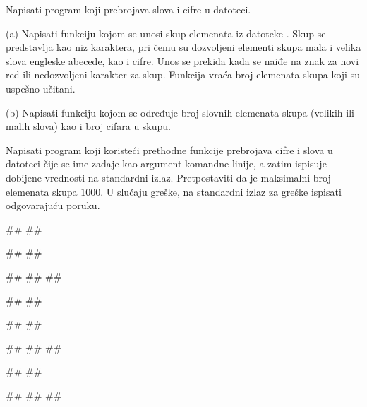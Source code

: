 \begin{Exercise}[label=p3_x4]         
Napisati program koji prebrojava slova i cifre u datoteci.
\begin{description}
\item{(a)} Napisati funkciju 
  kojom se unosi skup elemenata iz datoteke . Skup se predstavlja kao
  niz karaktera, pri čemu su dozvoljeni elementi skupa mala i
  velika slova engleske abecede, kao i cifre.  Unos se prekida kada se naiđe
  na znak za novi red ili nedozvoljeni karakter za skup.
  Funkcija vraća broj elemenata skupa koji su uspešno učitani.
\item{(b)} Napisati funkciju
   kojom se
  određuje broj slovnih elemenata skupa (velikih ili malih slova)
  kao i broj cifara u skupu.
\end{description}
Napisati program koji koristeći prethodne funkcije prebrojava cifre i slova u datoteci 
čije se ime zadaje kao argument komandne linije, a zatim ispisuje dobijene vrednosti na standardni izlaz.
Pretpostaviti da je maksimalni broj elemenata skupa $1000$.
U slučaju greške, na standardni izlaz za greške ispisati odgovarajuću poruku.

\begin{minitest}
\begin{upotreba}{1}
#\naslovPokretanje#
##

##
##

#\naslovIzlaz#
##
##
\end{upotreba}
\end{minitest}
\begin{minitest}
\begin{upotreba}{2}
#\naslovPokretanje#
##

##
##

#\naslovIzlaz#
##
##
\end{upotreba}
\end{minitest}
\begin{minitest}
\begin{upotreba}{3}
#\naslovPokretanje#
##

##
##
##


\end{upotreba}
\end{minitest}
\end{Exercise}

